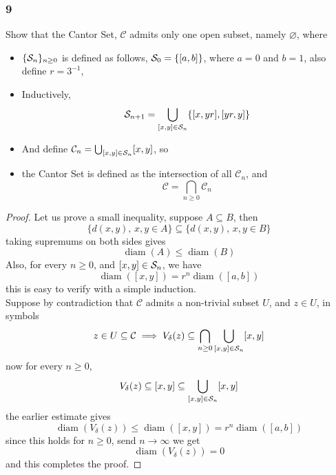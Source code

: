 \documentclass[../main.tex]{subfiles}
\begin{document}
\providecommand{\cant}{\mathcal{C}}
\providecommand{\diam}{\operatorname{diam}}
\subsubsection*{9}
\begin{wts}
    Show that the Cantor Set, $\cant$ admits only one open subset, namely $\varnothing$, where
    \begin{itemize}
        \item $\{\mathcal{S}_n\}_{n\geq 0}$ is defined as follows, $\mathcal{S}_0 = \{[a,b]\}$, where $a=0$ and $b=1$, also define $r=3^{-1}$, 
        \item Inductively, 
        \[\mathcal{S}_{n+1} = \bigcup_{[x,y]\in \mathcal{S}_{n}}\{[x,yr],[yr,y]\}\]
        \item And define $\cant_n=\bigcup_{[x,y]\in\szz_n}[x,y]$, so
        \item the Cantor Set is defined as the intersection of all $\cant_n$, and
        \[\cant = \bigcap_{n\geq 0}\cant_n\]
    \end{itemize}
\end{wts}
\begin{proof}
    Let us prove a small inequality, suppose $A\subseteq B$, then
    \[\biggl\{d(x,y),\,x,y\in A\biggr\}\subseteq \biggl\{d(x,y),\,x,y\in B\biggr\}\]
    taking supremums on both sides gives
    \[\diam(A)\leq\diam(B)\]
    Also, for every $n\geq 0$, and $[x,y]\in\mathcal{S}_n$, we have
    \[\diam([x,y])=r^n\diam([a,b])\]
    this is easy to verify with a simple induction.\\
    
    Suppose by contradiction that $\cant$ admits a non-trivial subset $U$, and $z\in U$, in symbols
    \[z\in U\subseteq \cant\implies V_\delta(z)\subseteq\bigcap_{n\geq 0}\bigcup_{[x,y]\in\szz_n}[x,y]\]
    now for every $n\geq 0$,
    \[V_\delta(z)\subseteq [x,y]\subseteq\bigcup_{[x,y]\in\mathcal{S}_n}[x,y]\]
    the earlier estimate gives
    \[\diam(V_\delta(z))\leq\diam([x,y])=r^n\diam([a,b])\]
    since this holds for $n\geq 0$, send $n\to\infty$ we get
    \[\diam(V_\delta(z))=0\]
    and this completes the proof.
\end{proof}
\end{document}
